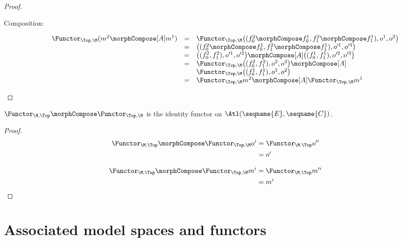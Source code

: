 \documentclass{article}
\begin{document}
\begin{theorem}
\begin{proof}
\begin{description}
\item[Composition:]
\begin{equation*}
\begin{array}{lll}
  \Functor_{\Top,\M} (m^2 \morphCompose[A] m^1)
  & =
  &
    \Functor_{\Top,\M}
      \bigl (
        (f_0^2 \morphCompose f_0^1, f_1^2 \morphCompose f_1^1),
        o^1,
        o^3
      \bigr )
\\*
  & =
  &
      \bigl (
        (f_0^2 \morphCompose f_0^1, f_1^2 \morphCompose f_1^1),
        o'^1,
        o'^3
      \bigr )
\\*
  & =
  &
      \bigl (
        (f_0^2, f_1^2),
        o'^1,
        o'^2
      \bigr )
      \morphCompose[A]
      \bigl (
        (f_0^1, f_1^1),
        o'^2,
        o'^3
      \bigr )
\\*
  & =
  &
    \Functor_{\Top,\M}
      \bigl (
        (f_0^2, f_1^2),
        o^2,
        o^3
      \bigr )
    \morphCompose[A]
\\*
  &
  &
    \Functor_{\Top,\M}
      \bigl (
        (f_0^1, f_1^1),
        o^1,
        o^2
      \bigr )
\\*
  & =
  &
  \Functor_{\Top,\M} m^2
  \morphCompose[A]
  \Functor_{\Top,\M} m^1
\end{array}
\end{equation*}
\end{description}
\end{proof}

$\Functor_{\M,\Top} \morphCompose \Functor_{\Top,\M}$ is the identity functor
on $\Atl(\seqname{E}, \seqname{C})$.

\begin{proof}
\begin{align*}
  \Functor_{\M,\Top} \morphCompose \Functor_{\Top,\M} o^i
  & =
  \Functor_{\M,\Top} o'^i
\\
  & =
   o^i
\end{align*}

\begin{align*}
  \Functor_{\M,\Top} \morphCompose \Functor_{\Top,\M} m^i
  & =
  \Functor_{\M,\Top} m'^i
\\
  & =
  m^i
\end{align*}

\end{proof}
\end{theorem}

\section{Associated model spaces and functors}
{
  \showlabelsinline
  \label{sec:assmod}
}
\end{document}
